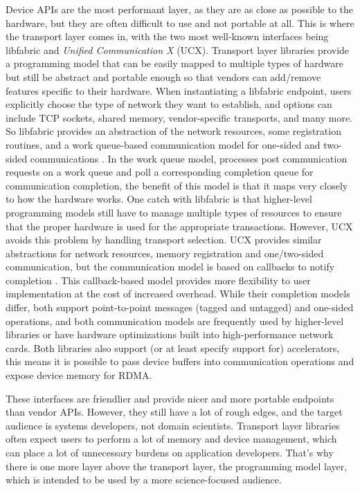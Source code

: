 Device APIs are the most performant layer, as they are as close as possible to the hardware, but they are often difficult to use and not portable at all.
This is where the transport layer comes in, with the two most well-known interfaces being libfabric and \textit{Unified Communication X} (UCX).
Transport layer libraries provide a programming model that can be easily mapped to multiple types of hardware but still be abstract and portable enough so that vendors can add/remove features specific to their hardware.
When instantiating a libfabric endpoint, users explicitly choose the type of network they want to establish, and options can include TCP sockets, shared memory, vendor-specific transports, and many more.
So libfabric provides an abstraction of the network resources, some registration routines, and a work queue-based communication model for one-sided and two-sided communications \cite{libfabric}.
In the work queue model, processes post communication requests on a work queue and poll a corresponding completion queue for communication completion, the benefit of this model is that it maps very closely to how the hardware works.
One catch with libfabric is that higher-level programming models still have to manage multiple types of resources to ensure that the proper hardware is used for the appropriate transactions. 
However, UCX avoids this problem by handling transport selection.
UCX provides similar abstractions for network resources, memory registration and one/two-sided communication, but the communication model is based on callbacks to notify completion \cite{shamis2015ucx}.
This callback-based model provides more flexibility to user implementation at the cost of increased overhead.
While their completion models differ, both support point-to-point messages (tagged and untagged) and one-sided operations, and both communication models are frequently used by higher-level libraries or have hardware optimizations built into high-performance network cards.
Both libraries also support (or at least specify support for) accelerators, this means it is possible to pass device buffers into communication operations and expose device memory for RDMA.

These interfaces are friendlier and provide nicer and more portable endpoints than vendor APIs. 
However, they still have a lot of rough edges, and the target audience is systems developers, not domain scientists.
Transport layer libraries often expect users to perform a lot of memory and device management, which can place a lot of unnecessary burdens on application developers.
That's why there is one more layer above the transport layer, the programming model layer, which is intended to be used by a more science-focused audience.

